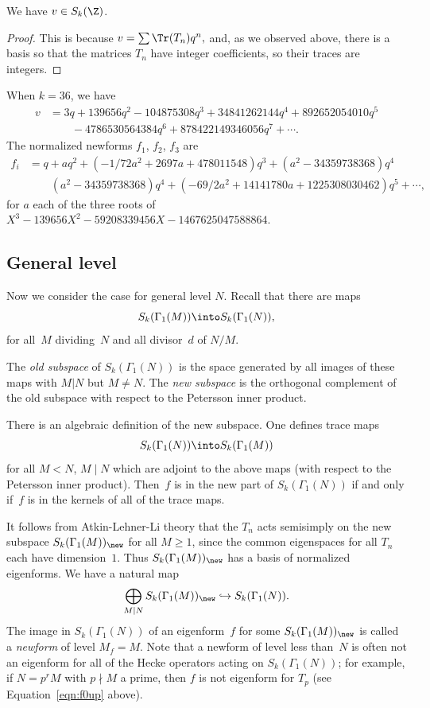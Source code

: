 \documentclass{report}
\begin{document}
\begin{proposition}
We have $v\in S_k(\Z)$.
\end{proposition}
\begin{proof}
This is because $v = \sum \Tr(T_n)q^n,$ and, as we observed above,
there is a basis so that the matrices $T_n$ have integer
coefficients, so their traces are integers.
\end{proof}
\begin{example}
When $k=36$, we have
\begin{align*}
   v &= 3q + 139656q^2 - 104875308q^3 + 34841262144q^4 + 892652054010q^5\\
   &\qquad - 4786530564384q^6 + 878422149346056q^7+ \cdots.
\end{align*}
The normalized newforms $f_1$, $f_2$, $f_3$ are
\begin{align*}
 f_i &= q + aq^2 + (-1/72a^2 + 2697a + 478011548)q^3 +(a^2 - 34359738368)q^4\\
 &\qquad (a^2 - 34359738368)q^4 + (-69/2a^2 + 14141780a +
 1225308030462)q^5+ \cdots,
\end{align*}
for $a$ each of the three roots of
$X^3-139656X^2-59208339456X-1467625047588864$.
\end{example}

\subsection{General level}\label{sec:rankone-genlev}
Now we consider the case for general level $N$. Recall that there
are maps
\[
  S_k(\Gamma_1(M))\into S_k(\Gamma_1(N)),
\]
for all~$M$ dividing~$N$ and all divisor~$d$ of $N/M$.

\begin{defn}
The {\em old subspace} of $S_k(\Gamma_1(N))$ is the space
generated by all images of these maps with $M|N$ but $M\neq N$.
The {\em new subspace} is the orthogonal complement of the old
subspace with respect to the Petersson inner product.
\end{defn}

There is an algebraic definition of the new subspace.  One defines
trace maps
\[
  S_k(\Gamma_1(N))\into S_k(\Gamma_1(M))
\]
for all $M<N$, $M\mid N$ which are adjoint to the above maps (with
respect to the Petersson inner product). Then~$f$ is in the new
part of $S_k(\Gamma_1(N))$ if and only if~$f$ is in the kernels of
all of the trace maps.

It follows from Atkin-Lehner-Li theory that the $T_n$ acts
semisimply on the new subspace $S_k(\Gamma_1(M))_{\new}$ for all $M\geq 1$, since
the common eigenspaces for all $T_n$ each have dimension~$1$. Thus
$S_k(\Gamma_1(M))_{\new}$ has a basis of normalized eigenforms. We
have a natural map
\[
\bigoplus_{M\mid N} S_k(\Gamma_1(M))_{\new}\hookrightarrow
               S_k(\Gamma_1(N)).
\]
The image in $S_k(\Gamma_1(N))$ of an eigenform~$f$ for some
$S_k(\Gamma_1(M))_{\new}$ is called a {\em newform} of level
$M_f=M$. Note that a newform of level less than~$N$ is often not an
eigenform for all of the Hecke operators acting on $S_k(\Gamma_1(N))$;
for example, if $N=p^r M$ with $p\nmid M$ a prime, then
$f$ is not eigenform for $T_p$ (see Equation~\ref{eqn:f0up} above).
\end{document}
